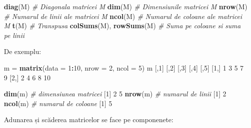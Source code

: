 \documentclass[]{article}
\newenvironment{Shaded}{\begin{snugshade}}{\end{snugshade}}
\newcommand{\KeywordTok}[1]{\textcolor[rgb]{0.13,0.29,0.53}{\textbf{#1}}}
\newcommand{\DataTypeTok}[1]{\textcolor[rgb]{0.13,0.29,0.53}{#1}}
\newcommand{\DecValTok}[1]{\textcolor[rgb]{0.00,0.00,0.81}{#1}}
\newcommand{\StringTok}[1]{\textcolor[rgb]{0.31,0.60,0.02}{#1}}
\newcommand{\CommentTok}[1]{\textcolor[rgb]{0.56,0.35,0.01}{\textit{#1}}}
\newcommand{\OperatorTok}[1]{\textcolor[rgb]{0.81,0.36,0.00}{\textbf{#1}}}
\newcommand{\NormalTok}[1]{#1}
\begin{document}
\begin{Shaded}
\begin{Highlighting}[]
\KeywordTok{diag}\NormalTok{(M) }\CommentTok{# Diagonala matricei M}
\KeywordTok{dim}\NormalTok{(M) }\CommentTok{# Dimensiunile matricei M}
\KeywordTok{nrow}\NormalTok{(M) }\CommentTok{# Numarul de linii ale matricei M}
\KeywordTok{ncol}\NormalTok{(M) }\CommentTok{# Numarul de coloane ale matricei M}
\KeywordTok{t}\NormalTok{(M) }\CommentTok{# Transpusa}
\KeywordTok{colSums}\NormalTok{(M), }\KeywordTok{rowSums}\NormalTok{(M) }\CommentTok{# Suma pe coloane si suma pe linii}
\end{Highlighting}
\end{Shaded}

De exemplu:

\begin{Shaded}
\begin{Highlighting}[]
\NormalTok{m =}\StringTok{ }\KeywordTok{matrix}\NormalTok{(}\DataTypeTok{data =} \DecValTok{1}\OperatorTok{:}\DecValTok{10}\NormalTok{,}
       \DataTypeTok{nrow =} \DecValTok{2}\NormalTok{,}
       \DataTypeTok{ncol =} \DecValTok{5}\NormalTok{)}
\NormalTok{m}
\NormalTok{     [,}\DecValTok{1}\NormalTok{] [,}\DecValTok{2}\NormalTok{] [,}\DecValTok{3}\NormalTok{] [,}\DecValTok{4}\NormalTok{] [,}\DecValTok{5}\NormalTok{]}
\NormalTok{[}\DecValTok{1}\NormalTok{,]    }\DecValTok{1}    \DecValTok{3}    \DecValTok{5}    \DecValTok{7}    \DecValTok{9}
\NormalTok{[}\DecValTok{2}\NormalTok{,]    }\DecValTok{2}    \DecValTok{4}    \DecValTok{6}    \DecValTok{8}   \DecValTok{10}

\KeywordTok{dim}\NormalTok{(m) }\CommentTok{# dimensiunea matricei}
\NormalTok{[}\DecValTok{1}\NormalTok{] }\DecValTok{2} \DecValTok{5}
\KeywordTok{nrow}\NormalTok{(m) }\CommentTok{# numarul de linii}
\NormalTok{[}\DecValTok{1}\NormalTok{] }\DecValTok{2}
\KeywordTok{ncol}\NormalTok{(m) }\CommentTok{# numarul de coloane}
\NormalTok{[}\DecValTok{1}\NormalTok{] }\DecValTok{5}
\end{Highlighting}
\end{Shaded}

Adunarea și scăderea matricelor se face pe componenete:
\end{document}
